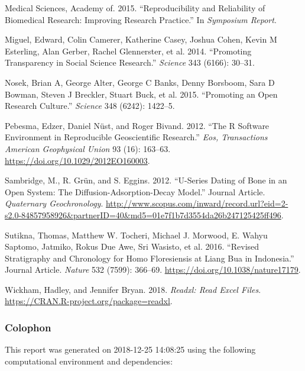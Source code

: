 \documentclass[]{elsarticle} %
\begin{document}
\leavevmode\hypertarget{ref-academy2015reproducibility}{}%
Medical Sciences, Academy of. 2015. ``Reproducibility and Reliability of Biomedical Research: Improving Research Practice.'' In \emph{Symposium Report}.

\leavevmode\hypertarget{ref-miguel2014promoting}{}%
Miguel, Edward, Colin Camerer, Katherine Casey, Joshua Cohen, Kevin M Esterling, Alan Gerber, Rachel Glennerster, et al. 2014. ``Promoting Transparency in Social Science Research.'' \emph{Science} 343 (6166): 30--31.

\leavevmode\hypertarget{ref-nosek2015promoting}{}%
Nosek, Brian A, George Alter, George C Banks, Denny Borsboom, Sara D Bowman, Steven J Breckler, Stuart Buck, et al. 2015. ``Promoting an Open Research Culture.'' \emph{Science} 348 (6242): 1422--5.

\leavevmode\hypertarget{ref-Pebesma_Nust_Bivand_2012}{}%
Pebesma, Edzer, Daniel Nüst, and Roger Bivand. 2012. ``The R Software Environment in Reproducible Geoscientific Research.'' \emph{Eos, Transactions American Geophysical Union} 93 (16): 163--63. \url{https://doi.org/10.1029/2012EO160003}.

\leavevmode\hypertarget{ref-Sambridge2012}{}%
Sambridge, M., R. Grün, and S. Eggins. 2012. ``U-Series Dating of Bone in an Open System: The Diffusion-Adsorption-Decay Model.'' Journal Article. \emph{Quaternary Geochronology}. \url{http://www.scopus.com/inward/record.url?eid=2-s2.0-84857958926\&partnerID=40\&md5=01e7f1b7d3554da26b247125425ff496}.

\leavevmode\hypertarget{ref-Sutikna2016}{}%
Sutikna, Thomas, Matthew W. Tocheri, Michael J. Morwood, E. Wahyu Saptomo, Jatmiko, Rokus Due Awe, Sri Wasisto, et al. 2016. ``Revised Stratigraphy and Chronology for Homo Floresiensis at Liang Bua in Indonesia.'' Journal Article. \emph{Nature} 532 (7599): 366--69. \url{https://doi.org/10.1038/nature17179}.

\leavevmode\hypertarget{ref-Wickham_readxl}{}%
Wickham, Hadley, and Jennifer Bryan. 2018. \emph{Readxl: Read Excel Files}. \url{https://CRAN.R-project.org/package=readxl}.

\newpage

\hypertarget{colophon}{%
\subsubsection{Colophon}\label{colophon}}

This report was generated on 2018-12-25 14:08:25 using the following computational environment and dependencies:
\end{document}
